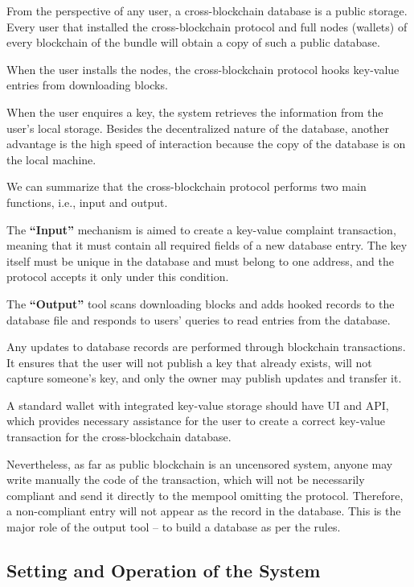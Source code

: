 \begin{multicols}{2}
From the perspective of any user, a cross-blockchain database is a public storage. Every user that installed the cross-blockchain protocol and full nodes (wallets) of every blockchain of the bundle will obtain a copy of such a public database.

When the user installs the nodes, the cross-blockchain protocol hooks key-value entries from downloading blocks.

When the user enquires a key, the system retrieves the information from the user’s local storage. Besides the decentralized nature of the database, another advantage is the high speed of interaction because the copy of the database is on the local machine.

We can summarize that the cross-blockchain protocol performs two main functions, i.e., input and output.

The \textbf{“Input”} mechanism is aimed to create a key-value complaint transaction, meaning that it must contain all required fields of a new database entry. The key itself must be unique in the database and must belong to one address, and the protocol accepts it only under this condition.

The \textbf{“Output”} tool scans downloading blocks and adds hooked records to the database file and responds to users’ queries to read entries from the database.

Any updates to database records are performed through blockchain transactions. It ensures that the user will not publish a key that already exists, will not capture someone’s key, and only the owner may publish updates and transfer it.

A standard wallet with integrated key-value storage should have UI and API, which provides necessary assistance for the user to create a correct key-value transaction for the cross-blockchain database.

Nevertheless, as far as public blockchain is an uncensored system, anyone may write manually the code of the transaction, which will not be necessarily compliant and send it directly to the mempool omitting the protocol. Therefore, a non-compliant entry will not appear as the record in the database. This is the major role of the output tool – to build a database as per the rules.

\setcounter{secnumdepth}{5}
\renewcommand\thesubsubsection{\arabic{section}.\arabic{subsection}.\alph{subsubsection}}
\vspace{-.2cm}

\subsection{Setting and Operation of the System}\label{subsec-4.2}


\end{multicols}
